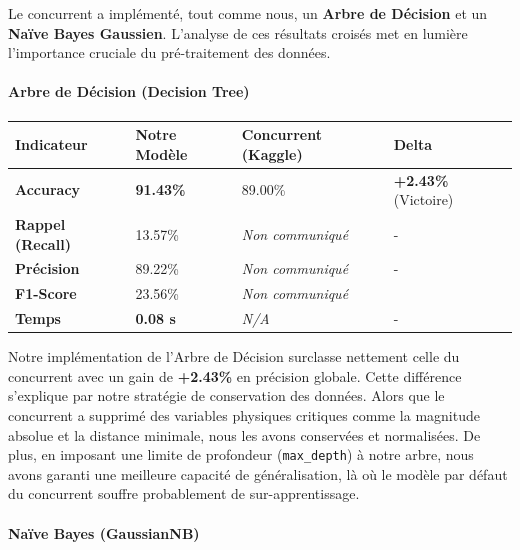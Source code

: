 \documentclass[11pt]{article}
\begin{document}
Le concurrent a implémenté, tout comme nous, un \textbf{Arbre de
  Décision} et un \textbf{Naïve Bayes Gaussien}. L'analyse de ces
résultats croisés met en lumière l'importance cruciale du pré-traitement
des données.

\paragraph{Arbre de Décision (Decision
  Tree)}\label{arbre-de-duxe9cision-decision-tree}

\begin{longtable}[]{@{}llll@{}}
  \toprule\noalign{}
  Indicateur               & Notre Modèle     & Concurrent (Kaggle)   & Delta            \\
  \midrule\noalign{}
  \endhead
  \bottomrule\noalign{}
  \endlastfoot
  \textbf{Accuracy}        & \textbf{91.43\%} & 89.00\%               & \textbf{+2.43\%}
  (Victoire)                                                                             \\
  \textbf{Rappel (Recall)} & 13.57\%          & \emph{Non communiqué} & -                \\
  \textbf{Précision}       & 89.22\%          & \emph{Non communiqué} & -                \\
  \textbf{F1-Score}        & 23.56\%          & \emph{Non communiqué} &                  \\
  \textbf{Temps}           & \textbf{0.08 s}  & \emph{N/A}            & -                \\
\end{longtable}

Notre implémentation de l'Arbre de Décision surclasse nettement celle du
concurrent avec un gain de \textbf{+2.43\%} en précision globale. Cette
différence s'explique par notre stratégie de conservation des données.
Alors que le concurrent a supprimé des variables physiques critiques
comme la magnitude absolue et la distance minimale, nous les avons
conservées et normalisées. De plus, en imposant une limite de profondeur
(\texttt{max\_depth}) à notre arbre, nous avons garanti une meilleure
capacité de généralisation, là où le modèle par défaut du concurrent
souffre probablement de sur-apprentissage.

\paragraph{Naïve Bayes (GaussianNB)}\label{nauxefve-bayes-gaussiannb}
\end{document}
